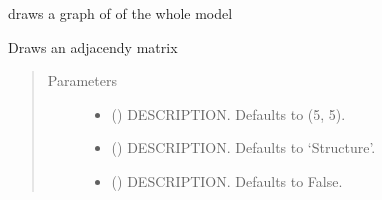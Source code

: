 \documentclass[letterpaper,10pt,english]{sphinxmanual}
\begin{document}
\begin{fulllineitems}
\begin{fulllineitems}
\end{fulllineitems}


\begin{fulllineitems}
\label{\detokenize{index:modelclass.Graph_Draw_Mixin.drawmodel}}
\pysigstartsignatures
{}
\pysigstopsignatures
\sphinxAtStartPar
draws a graph of of the whole model

\end{fulllineitems}


\begin{fulllineitems}
\label{\detokenize{index:modelclass.Graph_Draw_Mixin.plotadjacency}}
\pysigstartsignatures
{}
\pysigstopsignatures
\sphinxAtStartPar
Draws an adjacendy matrix
\begin{quote}\begin{description}
\item[{Parameters}] \leavevmode\begin{itemize}
\item {} 
\sphinxAtStartPar
{} (\sphinxstyleliteralemphasis{\sphinxupquote{, }}) \textendash{} DESCRIPTION. Defaults to (5, 5).

\item {} 
\sphinxAtStartPar
{} (\sphinxstyleliteralemphasis{\sphinxupquote{, }}) \textendash{} DESCRIPTION. Defaults to ‘Structure’.

\item {} 
\sphinxAtStartPar
{} (\sphinxstyleliteralemphasis{\sphinxupquote{, }}) \textendash{} DESCRIPTION. Defaults to False.


\end{itemize}
\end{description}
\end{quote}
\end{fulllineitems}
\end{fulllineitems}
\end{document}
